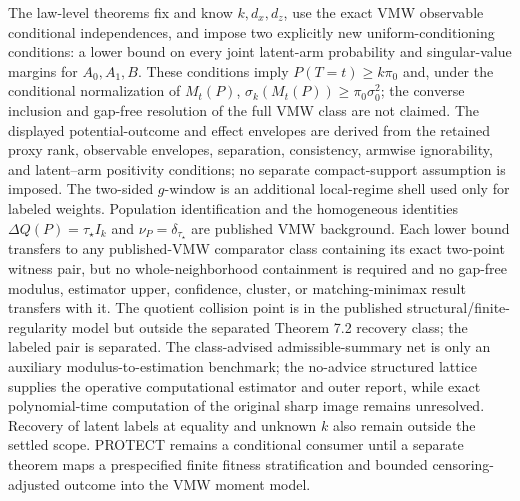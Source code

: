 \documentclass{article}
\begin{document}
The law-level theorems fix and know \(k,d_x,d_z\), use the exact VMW observable conditional independences, and impose two explicitly new uniform-conditioning conditions: a lower bound on every joint latent-arm probability and singular-value margins for \(A_0,A_1,B\). These conditions imply \(P(T=t)\ge k\pi_0\) and, under the conditional normalization of \(M_t(P)\), \(\sigma_k(M_t(P))\ge\pi_0\sigma_0^2\); the converse inclusion and gap-free resolution of the full VMW class are not claimed. The displayed potential-outcome and effect envelopes are derived from the retained proxy rank, observable envelopes, separation, consistency, armwise ignorability, and latent--arm positivity conditions; no separate compact-support assumption is imposed. The two-sided \(g\)-window is an additional local-regime shell used only for labeled weights. Population identification and the homogeneous identities \(\Delta Q(P)=\tau_\star I_k\) and \(\nu_P=\delta_{\tau_\star}\) are published VMW background. Each lower bound transfers to any published-VMW comparator class containing its exact two-point witness pair, but no whole-neighborhood containment is required and no gap-free modulus, estimator upper, confidence, cluster, or matching-minimax result transfers with it. The quotient collision point is in the published structural/finite-regularity model but outside the separated Theorem 7.2 recovery class; the labeled pair is separated. The class-advised admissible-summary net is only an auxiliary modulus-to-estimation benchmark; the no-advice structured lattice supplies the operative computational estimator and outer report, while exact polynomial-time computation of the original sharp image remains unresolved. Recovery of latent labels at equality and unknown \(k\) also remain outside the settled scope. PROTECT remains a conditional consumer until a separate theorem maps a prespecified finite fitness stratification and bounded censoring-adjusted outcome into the VMW moment model.
\end{document}
